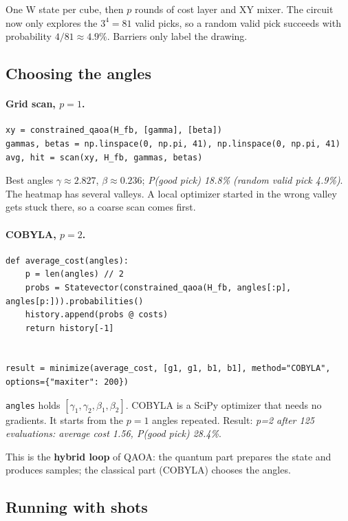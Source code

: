 \documentclass[11pt]{article}
\newcommand{\code}[1]{\texttt{#1}}
\begin{document}
One W state per cube, then $p$ rounds of cost layer and XY mixer. The circuit
now only explores the $3^4 = 81$ valid picks, so a random valid pick succeeds
with probability $4/81 \approx 4.9\%$. Barriers only label the drawing.

\subsection{Choosing the angles}

\paragraph{\texorpdfstring{Grid scan, $p=1$.}{Grid scan, p=1.}}
\begin{lstlisting}
xy = constrained_qaoa(H_fb, [gamma], [beta])
gammas, betas = np.linspace(0, np.pi, 41), np.linspace(0, np.pi, 41)
avg, hit = scan(xy, H_fb, gammas, betas)
\end{lstlisting}
Best angles $\gamma \approx 2.827$, $\beta \approx 0.236$; \emph{P(good pick)
18.8\% (random valid pick 4.9\%)}. The heatmap has several valleys. A local
optimizer started in the wrong valley gets stuck there, so a coarse scan comes
first.

\paragraph{\texorpdfstring{COBYLA, $p=2$.}{COBYLA, p=2.}}
\begin{lstlisting}
def average_cost(angles):
    p = len(angles) // 2
    probs = Statevector(constrained_qaoa(H_fb, angles[:p], angles[p:])).probabilities()
    history.append(probs @ costs)
    return history[-1]


result = minimize(average_cost, [g1, g1, b1, b1], method="COBYLA", options={"maxiter": 200})
\end{lstlisting}
\code{angles} holds $[\gamma_1, \gamma_2, \beta_1, \beta_2]$. COBYLA is a
SciPy optimizer that needs no gradients. It starts from the $p=1$ angles
repeated. Result: \emph{p=2 after 125 evaluations: average cost 1.56, P(good
pick) 28.4\%}.

This is the \textbf{hybrid loop} of QAOA: the quantum part prepares the state
and produces samples; the classical part (COBYLA) chooses the angles.

\subsection{Running with shots}
\end{document}
